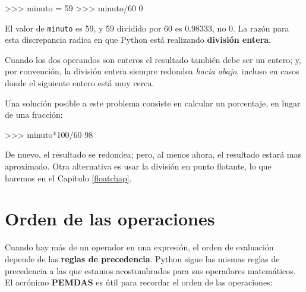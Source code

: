 \beforeverb
\begin{pyconcode}
>>> minuto = 59
>>> minuto/60
0
\end{pyconcode}
\afterverb
%

El valor de \texttt{minuto} es 59, y 59 dividido por 60 es 0.98333,
no 0. La razón para esta discrepancia radica en que Python está realizando
{\bf división entera}.


Cuando los dos operandos son enteros el resultado también debe ser un entero;
y, por convención, la división entera siempre redondea {\em hacia abajo},
incluso en casos donde el siguiente entero está muy cerca.

Una solución posible a este problema consiste en calcular un porcentaje, en
lugar de una fracción:

\beforeverb
\begin{pyconcode}
>>> minuto*100/60
98
\end{pyconcode}
\afterverb
%

De nuevo, el resultado se redondea; pero, al menos ahora, el resultado estará
mas aproximado.  Otra alternativa es usar la división en punto
flotante, lo que haremos en el Capítulo \ref{floatchap}.

\section{Orden de las operaciones}

Cuando hay más de un operador en una expresión, el orden de
evaluación depende de las {\bf reglas de precedencia}. Python sigue
las mismas reglas de precedencia a las que estamos acostumbrados para sus
operadores matemáticos.
El acrónimo {\bf PEMDAS} es útil para recordar el
orden de las operaciones:

